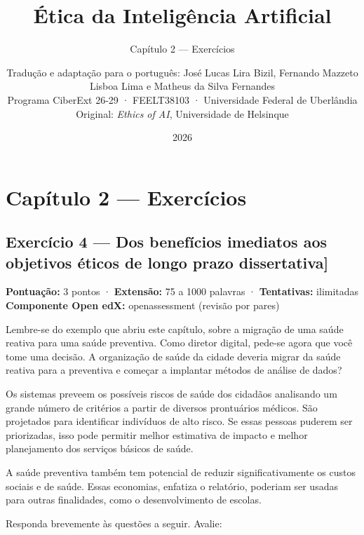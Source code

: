 \documentclass[
  11pt,
]{article}
\title{Ética da Inteligência Artificial}
\subtitle{Capítulo 2 --- Exercícios}
\author{Tradução e adaptação para o português: José Lucas Lira Bizil,
Fernando Mazzeto Lisboa Lima e Matheus da Silva Fernandes\\
Programa CiberExt 26-29 · FEELT38103 · Universidade Federal de
Uberlândia\\
Original: \emph{Ethics of AI}, Universidade de Helsinque}
\date{2026}
\renewcommand{\texttt}[1]{{\color{iaAmeixa}\small\ttfamily #1}}
\begin{document}
\maketitle

{
\hypersetup{linkcolor=iaConceitos}
\setcounter{tocdepth}{2}
\tableofcontents
}
\hypertarget{capuxedtulo-2-exercuxedcios}{%
\section{Capítulo 2 --- Exercícios}\label{capuxedtulo-2-exercuxedcios}}

\hypertarget{exercuxedcio-4-dos-benefuxedcios-imediatos-aos-objetivos-uxe9ticos-de-longo-prazo-dissertativa}{%
\subsection{\texorpdfstring{Exercício 4 --- Dos benefícios imediatos aos
objetivos éticos de longo prazo
\texttt{{[}dissertativa{]}}}{Exercício 4 --- Dos benefícios imediatos aos objetivos éticos de longo prazo {[}dissertativa{]}}}\label{exercuxedcio-4-dos-benefuxedcios-imediatos-aos-objetivos-uxe9ticos-de-longo-prazo-dissertativa}}

\textbf{Pontuação:} 3 pontos · \textbf{Extensão:} 75 a 1000 palavras ·
\textbf{Tentativas:} ilimitadas \textbf{Componente Open edX:}
\texttt{openassessment} (revisão por pares)

Lembre-se do exemplo que abriu este capítulo, sobre a migração de uma
saúde reativa para uma saúde preventiva. Como diretor digital, pede-se
agora que você tome uma decisão. A organização de saúde da cidade
deveria migrar da saúde reativa para a preventiva e começar a implantar
métodos de análise de dados?

Os sistemas preveem os possíveis riscos de saúde dos cidadãos analisando
um grande número de critérios a partir de diversos prontuários médicos.
São projetados para identificar indivíduos de alto risco. Se essas
pessoas puderem ser priorizadas, isso pode permitir melhor estimativa de
impacto e melhor planejamento dos serviços básicos de saúde.

A saúde preventiva também tem potencial de reduzir significativamente os
custos sociais e de saúde. Essas economias, enfatiza o relatório,
poderiam ser usadas para outras finalidades, como o desenvolvimento de
escolas.

Responda brevemente às questões a seguir. Avalie:
\end{document}
